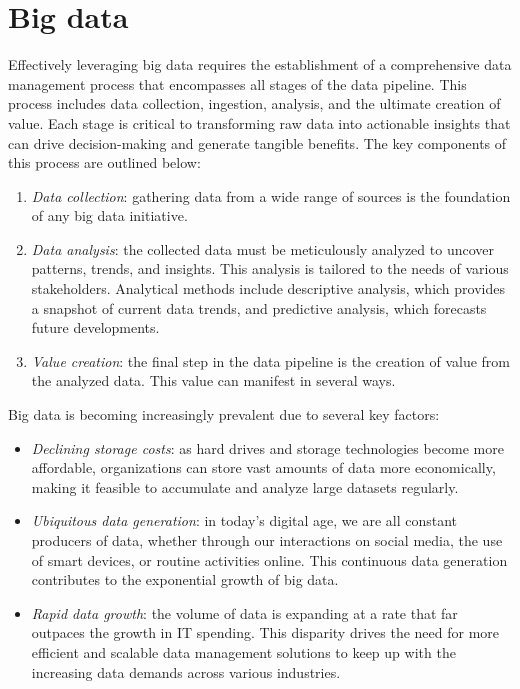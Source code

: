\section{Big data}

Effectively leveraging big data requires the establishment of a comprehensive data management process that encompasses all stages of the data pipeline. 
This process includes data collection, ingestion, analysis, and the ultimate creation of value. 
Each stage is critical to transforming raw data into actionable insights that can drive decision-making and generate tangible benefits. 
The key components of this process are outlined below:
\begin{enumerate}
    \item \textit{Data collection}: gathering data from a wide range of sources is the foundation of any big data initiative. 
    \item \textit{Data analysis}: the collected data must be meticulously analyzed to uncover patterns, trends, and insights. 
        This analysis is tailored to the needs of various stakeholders.
        Analytical methods include descriptive analysis, which provides a snapshot of current data trends, and predictive analysis, which forecasts future developments.
    \item \textit{Value creation}: the final step in the data pipeline is the creation of value from the analyzed data. 
        This value can manifest in several ways.
\end{enumerate} 
Big data is becoming increasingly prevalent due to several key factors:
\begin{itemize}
    \item \textit{Declining storage costs}: as hard drives and storage technologies become more affordable, organizations can store vast amounts of data more economically, making it feasible to accumulate and analyze large datasets regularly.
    \item \textit{Ubiquitous data generation}: in today's digital age, we are all constant producers of data, whether through our interactions on social media, the use of smart devices, or routine activities online. 
        This continuous data generation contributes to the exponential growth of big data.
    \item \textit{Rapid data growth}: the volume of data is expanding at a rate that far outpaces the growth in IT spending. 
        This disparity drives the need for more efficient and scalable data management solutions to keep up with the increasing data demands across various industries.
\end{itemize}
